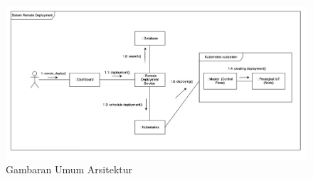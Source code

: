 \begin{figure}[ht]
  \centering
  \includegraphics[width=1\textwidth]{resources/chapter-3/gambaran-umum-arsitektur-updated.jpg}
  \caption{Gambaran Umum Arsitektur}
  \label{fig:gambaran-umum-arsitektur}
\end{figure}

\pagebreak






